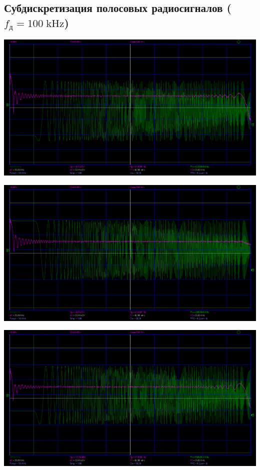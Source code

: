 \documentclass[12pt,a4paper]{article}
\begin{document}
\subsection*{Субдискретизация полосовых радиосигналов ($f_{\text{д}} = 100 \;\text{kHz}$)}
\vspace*{20pt}
\begin{center}
	\includegraphics[width=.8\linewidth]{data/2-1_rect_0-50KHZ_100KHZ}\hfill
\end{center}	
\begin{center}
	\includegraphics[width=.8\linewidth]{data/2-1_rect_200-250KHZ_100KHZ}\hfill
\end{center}	
\begin{center}
	\includegraphics[width=.8\linewidth]{data/2-1_rect_500-550KHZ_100KHZ}\hfill
\end{center}	
\end{document}
